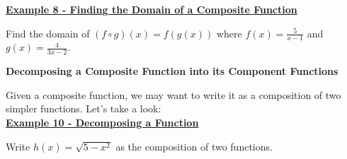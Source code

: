 \documentclass[12pt]{book}
\newcommand{\D}{\displaystyle}
\begin{document}
\underline{\textbf{Example 8 - Finding the Domain of a Composite Function}}
\vspace{2mm}

Find the domain of $(f \circ g)(x) = f(g(x))$ where 
$\D f(x) = \frac{5}{x-1}$ and $\D g(x) = \frac{4}{3x-2}$.

\newpage
{\large \textbf{Decomposing a Composite Function into its Component Functions}}
\vspace{3mm}

Given a composite function, we may want to write it as a composition of two simpler functions. Let's take a look:
\\

\underline{\textbf{Example 10 - Decomposing a Function}}
\vspace{2mm}

Write $\D h(x) = \sqrt{5-x^2}$ as the composition of two functions. 
\newpage
\end{document}
